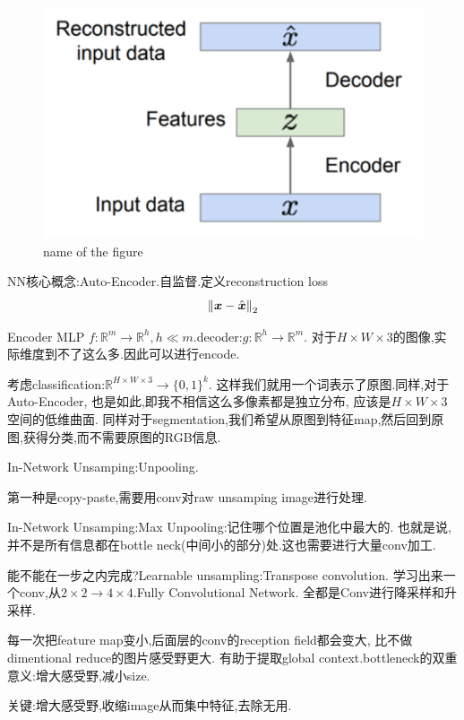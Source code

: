 \begin{figure}
	\includegraphics[scale=0.5]{figures/autoencoder.png}
	\caption{name of the figure}
\end{figure}
NN核心概念:Auto-Encoder.自监督.定义reconstruction loss
\begin{equation}
	\left \Vert \boldsymbol x - \hat{\boldsymbol{x}}  \right \Vert_2
\end{equation}

Encoder MLP $f:\mathbb R^m \to \mathbb R^h, h \ll m$.decoder:$g:\mathbb R^h \to \mathbb R^m$.
对于$H \times W \times 3$的图像,实际维度到不了这么多.因此可以进行encode.

考虑classification:$\mathbb R^{H \times W \times 3} \to \{0, 1\}^{k}$.
这样我们就用一个词表示了原图.同样,对于Auto-Encoder,
也是如此,即我不相信这么多像素都是独立分布,
应该是$H \times W \times 3$空间的低维曲面.
同样对于segmentation,我们希望从原图到特征map,然后回到原图,获得分类,而不需要原图的RGB信息.

In-Network Unsamping:Unpooling.

第一种是copy-paste,需要用conv对raw unsamping image进行处理.

In-Network Unsamping:Max Unpooling:记住哪个位置是池化中最大的.
也就是说,并不是所有信息都在bottle neck(中间小的部分)处.这也需要进行大量conv加工.

能不能在一步之内完成?Learnable unsampling:Transpose convolution.
学习出来一个conv,从$2 \times 2 \to 4 \times 4$.Fully Convolutional Network.
全都是Conv进行降采样和升采样.

每一次把feature map变小,后面层的conv的reception field都会变大,
比不做dimentional reduce的图片感受野更大.
有助于提取global context.bottleneck的双重意义:增大感受野,减小size.

关键:增大感受野,收缩image从而集中特征,去除无用.

